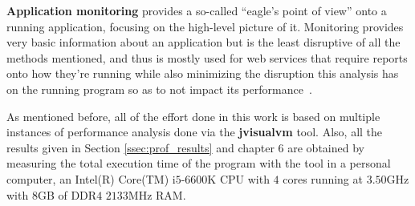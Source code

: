 \textbf{Application monitoring} provides a so-called ``eagle's point of view'' onto a running application, focusing on the high-level picture of it.
Monitoring provides very basic information about an application but is the least disruptive of all the methods mentioned, and thus is mostly used for web services that require reports onto how they're running while also minimizing the disruption this analysis has on the running program so as to not impact its performance~\cite{hunt2011java}.

As mentioned before, all of the effort done in this work is based on multiple instances of performance analysis done via the \textbf{jvisualvm} tool.
Also, all the results given in Section \ref{ssec:prof_results} and chapter $6$ are obtained by measuring the total execution time of the program with the tool in a personal computer, an Intel(R) Core(TM) i$5$-$6600$K CPU with $4$ cores running at $3.50$GHz with $8$GB of DDR$4$ $2133$MHz RAM. %